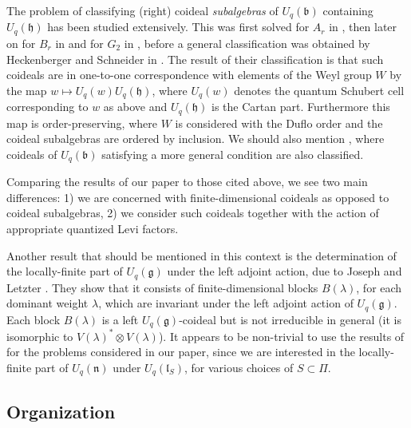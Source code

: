 \documentclass[a4paper, 12pt, reqno, english]{amsart}
\numberwithin{equation}{section}
\numberwithin{figure}{section}
\theoremstyle{plain}
\theoremstyle{plain}
\theoremstyle{plain}
\theoremstyle{plain}
\theoremstyle{plain}
\theoremstyle{definition}
\theoremstyle{definition}
\theoremstyle{definition}
\theoremstyle{remark}
\theoremstyle{definition}
\theoremstyle{definition}
\newcommand{\Uqb}{U_q(\mathfrak{b})}
\newcommand{\Uqg}{U_q(\mathfrak{g})}
\newcommand{\Uqh}{U_q(\mathfrak{h})}
\newcommand{\Uqn}{U_q(\mathfrak{n})}
\newcommand{\UqlS}{U_q(\mathfrak{l}_S)}
\newcommand{\schub}{U_q}
\newcommand{\simpleroots}{\Pi}
\begin{document}
The problem of classifying (right) coideal \emph{subalgebras} of $\Uqb$ containing $\Uqh$ has been studied extensively. This was first solved for $A_r$ in \cite{coideal-Ar}, then later on for $B_r$ in \cite{coideal-Br} and for $G_2$ in \cite{coideal-G2}, before a general classification was obtained by Heckenberger and Schneider in \cite{heckenberger-schneider}.
The result of their classification is that such coideals are in one-to-one correspondence with elements of the Weyl group $W$ by the map $w \mapsto \schub(w) \Uqh$, where $\schub(w)$ denotes the quantum Schubert cell corresponding to $w$ as above and $\Uqh$ is the Cartan part.
Furthermore this map is order-preserving, where $W$ is considered with the Duflo order and the coideal subalgebras are ordered by inclusion.
We should also mention \cite{heckenberger-kolb}, where coideals of $\Uqb$ satisfying a more general condition are also classified.

Comparing the results of our paper to those cited above, we see two main differences: 1) we are concerned with finite-dimensional coideals as opposed to coideal subalgebras, 2) we consider such coideals together with the action of appropriate quantized Levi factors.

Another result that should be mentioned in this context is the determination of the locally-finite part of $\Uqg$ under the left adjoint action, due to Joseph and Letzter \cite{joseph-letzter}.
They show that it consists of finite-dimensional blocks $B(\lambda)$, for each dominant weight $\lambda$, which are invariant under the left adjoint action of $\Uqg$.
Each block $B(\lambda)$ is a left $\Uqg$-coideal but is not irreducible in general (it is isomorphic to $V(\lambda)^* \otimes V(\lambda)$).
It appears to be non-trivial to use the results of \cite{joseph-letzter} for the problems considered in our paper, since we are interested in the locally-finite part of $\Uqn$ under $\UqlS$, for various choices of $S \subset \simpleroots$.

\subsection{Organization}
\end{document}
